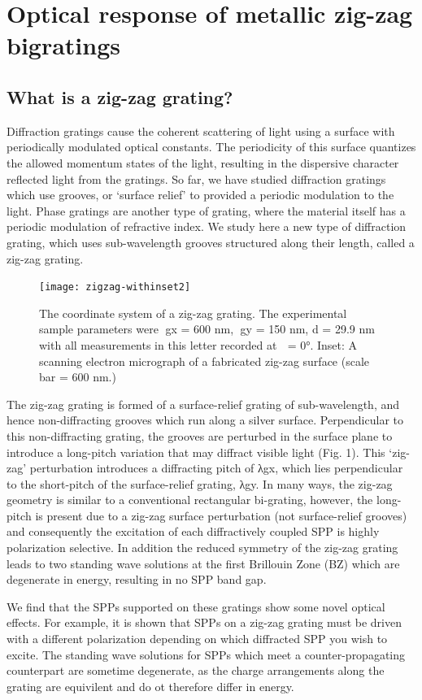 \documentclass[oneside,11pt,book]{book}
\begin{document}
\chapter{Optical response of metallic zig-zag bigratings}
\section{What is a zig-zag grating?}
Diffraction gratings cause the coherent scattering of light using a surface with periodically modulated optical constants. The periodicity of this surface quantizes the allowed momentum states of the light, resulting in the dispersive character reflected light from the gratings. So far, we have studied diffraction gratings which use grooves, or `surface relief' to provided a periodic modulation to the light. Phase gratings are another type of grating, where the material itself has a periodic modulation of refractive index. We study here a new type of diffraction grating, which uses sub-wavelength grooves structured along their length, called a zig-zag grating. 
\begin{figure}
\centering\texttt{[image: zigzag-withinset2]}
\caption{The coordinate system of a zig-zag grating. The experimental sample parameters were gx = 600 nm, gy = 150 nm, d = 29.9 nm with all measurements in this letter recorded at  = 0°. Inset: A scanning electron micrograph of a fabricated zig-zag surface (scale bar = 600 nm.)}
\end{figure}
The zig-zag grating is formed of a surface-relief grating of sub-wavelength, and hence non-diffracting grooves which run along a silver surface. Perpendicular to this non-diffracting grating, the grooves are perturbed in the surface plane to introduce a long-pitch variation that may diffract visible light (Fig. 1). This ‘zig-zag’ perturbation introduces a diffracting pitch of λgx, which lies perpendicular to the short-pitch of the surface-relief grating, λgy. In many ways, the zig-zag geometry is similar to a conventional rectangular bi-grating, however, the long-pitch is present due to a zig-zag surface perturbation (not surface-relief grooves) and consequently the excitation of each diffractively coupled SPP is highly polarization selective. In addition the reduced symmetry of the zig-zag grating leads to two standing wave solutions at the first Brillouin Zone (BZ) which are degenerate in energy, resulting in no SPP band gap.

We find that the SPPs supported on these gratings show some novel optical effects. For example, it is shown that SPPs on a zig-zag grating  must be driven with a different polarization depending on which diffracted SPP you wish to excite. The standing wave solutions for SPPs which meet a counter-propagating counterpart are sometime degenerate, as the charge arrangements along the grating are equivilent and do ot therefore differ in energy.
\end{document}
